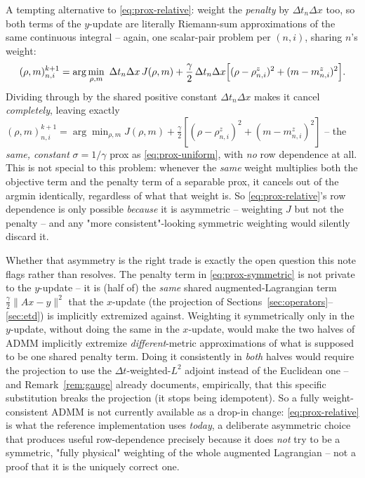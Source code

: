 \documentclass[11pt]{article}
\newcommand{\dt}{\Delta t}
\newcommand{\dx}{\Delta x}
\begin{document}
A tempting alternative to \eqref{eq:prox-relative}: weight the \emph{penalty} by $\dt_n\dx$ too,
so both terms of the $y$-update are literally Riemann-sum approximations of the same continuous
integral -- again, one scalar-pair problem per $(n,i)$, sharing $n$'s weight:
\begin{equation}
  \label{eq:prox-symmetric}
  (\rho,m)^{k+1}_{n,i} = \arg\min_{\rho,m}\ \dt_n\dx\,J(\rho,m)
  + \frac{\gamma}{2}\,\dt_n\dx\Bigl[(\rho-\rho^z_{n,i})^2+(m-m^z_{n,i})^2\Bigr].
\end{equation}
Dividing through by the shared positive constant $\dt_n\dx$ makes it cancel \emph{completely},
leaving exactly
$(\rho,m)^{k+1}_{n,i}=\arg\min_{\rho,m} J(\rho,m)+\frac{\gamma}{2}[(\rho-\rho^z_{n,i})^2+(m-m^z_{n,i})^2]$ -- the
\emph{same, constant} $\sigma=1/\gamma$ prox as \eqref{eq:prox-uniform}, with \emph{no} row
dependence at all. This is not special to this problem: whenever the \emph{same} weight
multiplies both the objective term and the penalty term of a separable prox, it cancels out of
the argmin identically, regardless of what that weight is. So \eqref{eq:prox-relative}'s row
dependence is only possible \emph{because} it is asymmetric -- weighting $J$ but not the penalty
-- and any "more consistent"-looking symmetric weighting would silently discard it.

Whether that asymmetry is the right trade is exactly the open question this note flags rather
than resolves. The penalty term in \eqref{eq:prox-symmetric} is not private to the $y$-update --
it is (half of) the \emph{same} shared augmented-Lagrangian term $\frac{\gamma}{2}\|Ax-y\|^2$ that
the $x$-update (the projection of Sections~\ref{sec:operators}--\ref{sec:etd}) is implicitly
extremized against. Weighting it symmetrically only in the $y$-update, without doing the same in
the $x$-update, would make the two halves of ADMM implicitly extremize \emph{different}-metric
approximations of what is supposed to be one shared penalty term. Doing it consistently in
\emph{both} halves would require the projection to use the $\dt$-weighted-$L^2$ adjoint instead
of the Euclidean one -- and Remark~\ref{rem:gauge} already documents, empirically, that this
specific substitution breaks the projection (it stops being idempotent). So a fully
weight-consistent ADMM is not currently available as a drop-in change: \eqref{eq:prox-relative}
is what the reference implementation uses \emph{today}, a deliberate asymmetric choice that
produces useful row-dependence precisely because it does \emph{not} try to be a symmetric,
"fully physical" weighting of the whole augmented Lagrangian -- not a proof that it is the
uniquely correct one.
\end{document}
